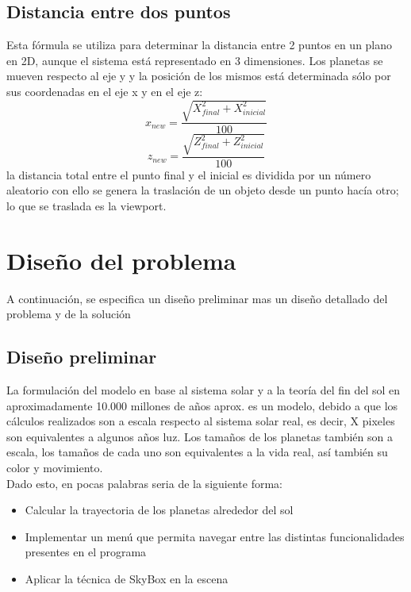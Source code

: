 \documentclass[12pt,journal,compsoc]{IEEEtran}
\begin{document}
\subsection{Distancia entre dos puntos}
Esta fórmula se utiliza para determinar la distancia entre 2 puntos en un plano en 2D, aunque el sistema está representado en 3 dimensiones. Los planetas se mueven respecto al eje y y la posición de los mismos está determinada sólo por sus coordenadas en el eje x y en el eje z:\\
\[ 
	x_{new} = \frac{\sqrt{X_{final}^{2}+X_{inicial}^{2}}}{100} 
\]
\newline
\[
	z_{new} = \frac{\sqrt{Z_{final}^{2}+Z_{inicial}^{2}}}{100}
\]
\newline
la distancia total entre el punto final y el inicial es dividida por un número aleatorio con ello se genera la traslación de un objeto desde un punto hacía otro; lo que se traslada es la viewport.
\section{Diseño del problema}
A continuación, se especifica un diseño preliminar mas un diseño detallado del problema y de la solución
\subsection{Diseño preliminar}
La formulación del modelo en base al sistema solar y a la teoría del fin del sol en aproximadamente 10.000 millones de años aprox. es un modelo, debido a que los cálculos realizados son a escala respecto al sistema solar real, es decir, X pixeles son equivalentes a algunos años luz. Los tamaños de los planetas también son a escala, los tamaños de cada uno son equivalentes a la vida real, así también su color y movimiento.
\\
Dado esto, en pocas palabras seria de la siguiente forma:
\begin{itemize}
 \item Calcular la trayectoria de los planetas alrededor del sol
 \item Implementar un menú que permita navegar entre las
 distintas funcionalidades presentes en el programa
 \item Aplicar la técnica de SkyBox en la escena
\end{itemize}
\end{document}
